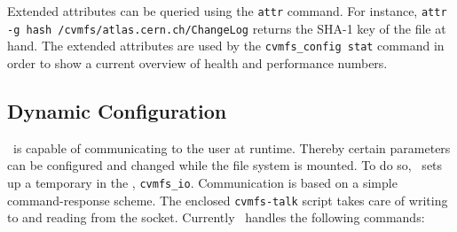 Extended attributes can be queried using the \texttt{attr} command.
For instance, \texttt{attr -g hash /cvmfs/atlas.cern.ch/ChangeLog} returns the SHA-1 key of the file at hand.
The extended attributes are used by the \texttt{cvmfs\_config stat} command in order to show a current overview of health and performance numbers.

\subsection{Dynamic Configuration}
\label{sct:dynconf}

\cvmfs\ is capable of communicating to the user at runtime.
Thereby certain parameters can be configured and changed while the file system is mounted.
To do so, \cvmfs\ sets up a temporary  in the , \texttt{cvmfs\_io}.
Communication is based on a simple command-response scheme.
The enclosed \texttt{cvmfs-talk} script takes care of writing to and reading from the socket.
Currently \cvmfs\ handles the following commands:
